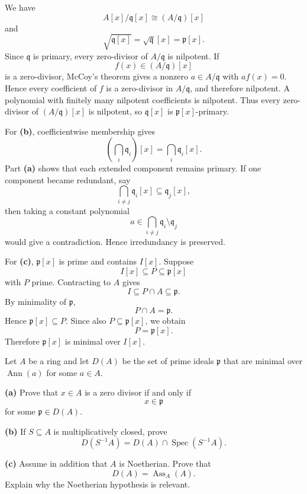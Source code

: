 \begin{solution}
We have
\[
A[x]/\mathfrak q[x]\cong(A/\mathfrak q)[x]
\]
and
\[
\sqrt{\mathfrak q[x]}
=
\sqrt{\mathfrak q}[x]
=
\mathfrak p[x].
\]
Since \(\mathfrak q\) is primary, every zero-divisor of \(A/\mathfrak q\) is
nilpotent. If
\[
f(x)\in(A/\mathfrak q)[x]
\]
is a zero-divisor, McCoy's theorem gives a nonzero \(a\in A/\mathfrak q\)
with \(af(x)=0\). Hence every coefficient of \(f\) is a zero-divisor in
\(A/\mathfrak q\), and therefore nilpotent. A polynomial with finitely many
nilpotent coefficients is nilpotent. Thus every zero-divisor of
\((A/\mathfrak q)[x]\) is nilpotent, so \(\mathfrak q[x]\) is
\(\mathfrak p[x]\)-primary.

For \textbf{(b)}, coefficientwise membership gives
\[
\left(\bigcap_i\mathfrak q_i\right)[x]
=
\bigcap_i\mathfrak q_i[x].
\]
Part \textbf{(a)} shows that each extended component remains primary.
If one component became redundant, say
\[
\bigcap_{i\ne j}\mathfrak q_i[x]\subseteq\mathfrak q_j[x],
\]
then taking a constant polynomial
\[
a\in\bigcap_{i\ne j}\mathfrak q_i\setminus\mathfrak q_j
\]
would give a contradiction. Hence irredundancy is preserved.

For \textbf{(c)}, \(\mathfrak p[x]\) is prime and contains \(I[x]\).
Suppose
\[
I[x]\subseteq P\subseteq\mathfrak p[x]
\]
with \(P\) prime. Contracting to \(A\) gives
\[
I\subseteq P\cap A\subseteq\mathfrak p.
\]
By minimality of \(\mathfrak p\),
\[
P\cap A=\mathfrak p.
\]
Hence \(\mathfrak p[x]\subseteq P\). Since also \(P\subseteq\mathfrak p[x]\),
we obtain
\[
P=\mathfrak p[x].
\]
Therefore \(\mathfrak p[x]\) is minimal over \(I[x]\).
\end{solution}


\begin{problem}[CP-V-0051]
\label{prob:cp-v-0051}
Let \(A\) be a ring and let \(D(A)\) be the set of prime ideals
\(\mathfrak p\) that are minimal over \(\operatorname{Ann}(a)\) for some
\(a\in A\).

\textbf{(a)} Prove that \(x\in A\) is a zero divisor if and only if
\[
x\in\mathfrak p
\]
for some \(\mathfrak p\in D(A)\).

\textbf{(b)} If \(S\subseteq A\) is multiplicatively closed, prove
\[
D(S^{-1}A)=D(A)\cap\operatorname{Spec}(S^{-1}A).
\]

\textbf{(c)} Assume in addition that \(A\) is Noetherian.
Prove that
\[
D(A)=\operatorname{Ass}_A(A).
\]
Explain why the Noetherian hypothesis is relevant.
\end{problem}

